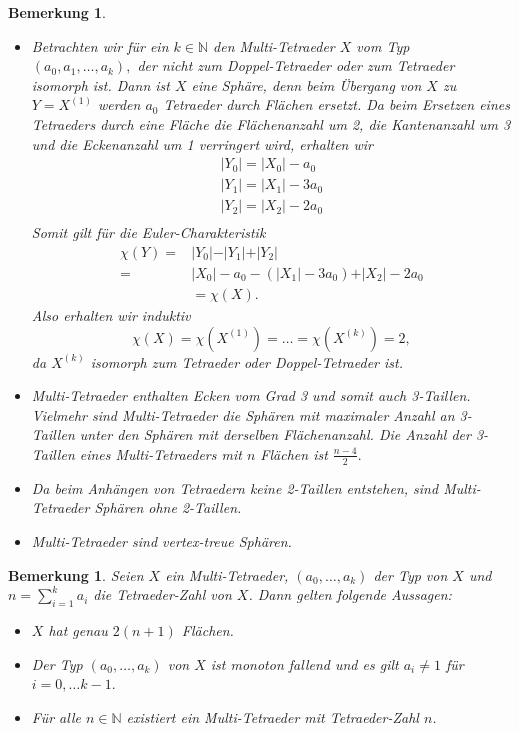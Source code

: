 \documentclass[12pt,titlepage,twoside,cleardoublepage]{article}
\theoremstyle{nummermitklammern}
\newtheorem{bemerkung}[temp]{Bemerkung}
\newtheorem{bemerkung}[zahl]{Bemerkung}
\numberwithin{equation}{section}
\begin{document}
\begin{bemerkung}
\begin{itemize}
\item Betrachten wir für ein $k\in \mathbb{N}$ den Multi-Tetraeder $X$ vom Typ $(a_0,a_1,\ldots,a_k),$ der nicht zum Doppel-Tetraeder oder zum Tetraeder isomorph ist. Dann ist $X$ eine Sphäre, denn beim Übergang von $X$ zu $Y=X^{(1)}$ werden $a_0$ Tetraeder durch Flächen ersetzt. Da beim Ersetzen eines Tetraeders durch eine Fläche die Flächenanzahl um 2, die Kantenanzahl um 3 und die Eckenanzahl um 1 verringert wird, erhalten wir  
\begin{align*}
\vert Y_0\vert =\vert X_0\vert-a_0\\
\vert Y_1\vert=\vert X_1\vert-3a_0\\
\vert Y_2\vert=\vert X_2\vert-2a_0\\
\end{align*}
Somit gilt für die Euler-Charakteristik
\begin{align*}
\chi(Y)=&\vert Y_0\vert -\vert Y_1\vert+\vert Y_2\vert\\
=&\vert X_0\vert-a_0-(\vert X_1\vert-3a_0)+\vert X_2\vert-2a_0\\
&=\chi (X).
\end{align*}
Also erhalten wir induktiv 
\[
\chi(X)=\chi(X^{(1)})=\ldots=\chi(X^{(k)})=2,
\]
da $X^{(k)}$ isomorph zum Tetraeder oder Doppel-Tetraeder ist.
\item Multi-Tetraeder enthalten Ecken vom Grad 3 und somit auch 3-Taillen. Vielmehr sind Multi-Tetraeder die Sphären mit maximaler Anzahl an 3-Taillen unter den Sphären mit derselben Flächenanzahl. Die Anzahl der 3-Taillen eines Multi-Tetraeders mit $n$ Flächen ist $\frac{n-4}{2}.$

\item
Da beim Anhängen von Tetraedern keine 2-Taillen entstehen, sind Multi-Tetraeder Sphären ohne 2-Taillen.
\item
Multi-Tetraeder sind vertex-treue Sphären.
\end{itemize}
\end{bemerkung}
\begin{bemerkung}
Seien $X$ ein Multi-Tetraeder, $(a_0,\ldots,a_k)$ der Typ von $X$ und $n=\sum_{i=1}^{k}a_i$ die Tetraeder-Zahl von $X$. Dann gelten folgende Aussagen: 
\begin{itemize}
\item $X$ hat genau $2(n+1)$ Flächen. 
\item Der Typ $(a_0,\ldots,a_k)$ von $X$ ist monoton fallend und es gilt $a_i\neq 1$ für $i=0,\ldots k-1.$
\item  Für alle $n \in \mathbb{N}$ existiert ein Multi-Tetraeder mit Tetraeder-Zahl $n$.
\end{itemize}
\end{bemerkung}
\end{document}
